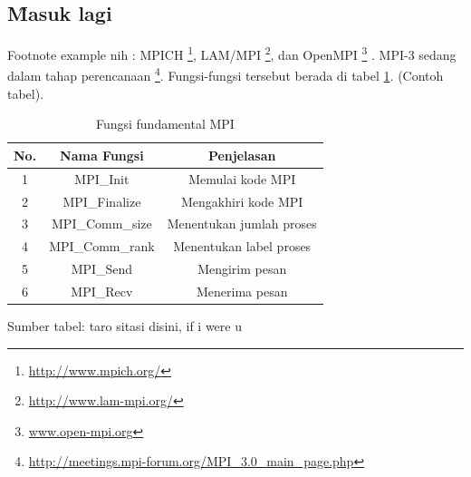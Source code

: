 \subsection{\f{Masuk lagi}}
Footnote example nih : MPICH \footnote{\url{http://www.mpich.org/}}, LAM/MPI \footnote{\url{http://www.lam-mpi.org/}}, dan OpenMPI \footnote{\url{www.open-mpi.org}} \citep{article.mcguire}. MPI-3 sedang dalam tahap perencanaan \footnote{\url{http://meetings.mpi-forum.org/MPI_3.0_main_page.php}}. Fungsi-fungsi tersebut berada di tabel \ref{tab:mpifund}. (Contoh tabel).

\begin{table}
	\centering
	\caption{Fungsi fundamental MPI}
	\label{tab:mpifund}
	\begin{tabular}{|c|c|c|}
	\hline
	\rowcolor{headertbl}	
	\hline No. & Nama Fungsi & Penjelasan \\ 
	\hline 1 & MPI\_Init & Memulai kode MPI \\ 
	\hline 2 & MPI\_Finalize & Mengakhiri kode MPI \\ 
	\hline 3 & MPI\_Comm\_size & Menentukan jumlah proses \\ 
	\hline 4 & MPI\_Comm\_rank & Menentukan label proses \\ 
	\hline 5 & MPI\_Send & Mengirim pesan \\ 
	\hline 6 & MPI\_Recv & Menerima pesan \\ 
	\hline
	\end{tabular}
\end{table}
\begin{center}
{\small Sumber tabel: taro sitasi disini, if i were u}
\end{center}

